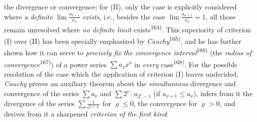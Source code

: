 \thispagestyle{fancy}

\vspace{0.5cm}

the divergence or convergence; for (II), only the case is explicitly considered where \textit{a definite} $\lim \frac{a_{\nu+1}}{a_\nu}$ \textit{exists}, i.e., besides the case $\lim \frac{a_{\nu+1}}{a_\nu} = 1$, all those remain unresolved where \textit{no definite limit} exists\textsuperscript{164)}. This superiority of criterion (I) over (II) has been specially emphasized by \textit{Cauchy}\textsuperscript{165)}, and he has further shown how it can serve to \textit{precisely fix} \textit{the convergence interval}\textsuperscript{166)} (the \textit{radius of convergence}\textsuperscript{167)}) of a power series $\sum a_\nu x^\nu$ in \textit{every} case\textsuperscript{168)}. For the possible resolution of the case which the application of criterion (I) leaves undecided, \textit{Cauchy} proves an auxiliary theorem about the \textit{simultaneous} divergence and convergence of the series $\sum a_\nu$ and $\sum 2^\nu \cdot a_{2^\nu - 1}$ (if $a_{\nu+1} \le a_\nu$), infers from it the divergence of the series $\sum \frac{1}{\nu^{1+\varrho}}$ for $\varrho \leq 0$, the convergence for $\varrho > 0$, and derives from it a sharpened \textit{criterion of the first kind}:

